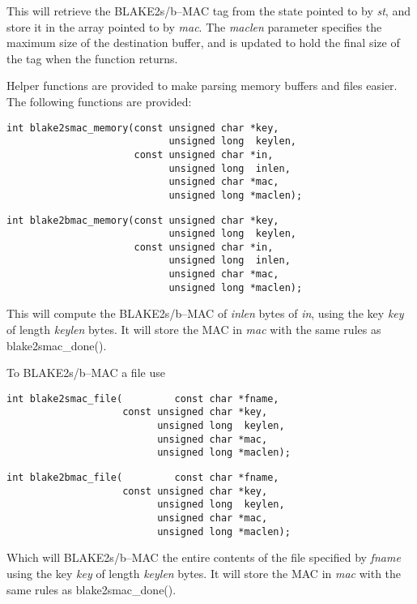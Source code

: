 \documentclass[synpaper]{book}
\begin{document}
This will retrieve the BLAKE2s/b--MAC tag from the state pointed to by \textit{st}, and store it in the array pointed to by \textit{mac}.
The \textit{maclen} parameter specifies the maximum size of the destination buffer, and is updated to hold the final size of the tag when
the function returns.

Helper functions are provided to make parsing memory buffers and files easier. The following functions are provided:
\begin{verbatim}
int blake2smac_memory(const unsigned char *key,
                            unsigned long  keylen,
                      const unsigned char *in,
                            unsigned long  inlen,
                            unsigned char *mac,
                            unsigned long *maclen);
\end{verbatim}
\begin{verbatim}
int blake2bmac_memory(const unsigned char *key,
                            unsigned long  keylen,
                      const unsigned char *in,
                            unsigned long  inlen,
                            unsigned char *mac,
                            unsigned long *maclen);
\end{verbatim}
This will compute the BLAKE2s/b--MAC of \textit{inlen} bytes of \textit{in}, using the key \textit{key} of length \textit{keylen} bytes.
It will store the MAC in \textit{mac} with the same rules as blake2smac\_done().

To BLAKE2s/b--MAC a file use
\begin{verbatim}
int blake2smac_file(         const char *fname,
                    const unsigned char *key,
                          unsigned long  keylen,
                          unsigned char *mac,
                          unsigned long *maclen);
\end{verbatim}
\begin{verbatim}
int blake2bmac_file(         const char *fname,
                    const unsigned char *key,
                          unsigned long  keylen,
                          unsigned char *mac,
                          unsigned long *maclen);
\end{verbatim}

Which will BLAKE2s/b--MAC the entire contents of the file specified by \textit{fname} using the key \textit{key} of
length \textit{keylen} bytes. It will store the MAC in \textit{mac} with the same rules as blake2smac\_done().
\end{document}
